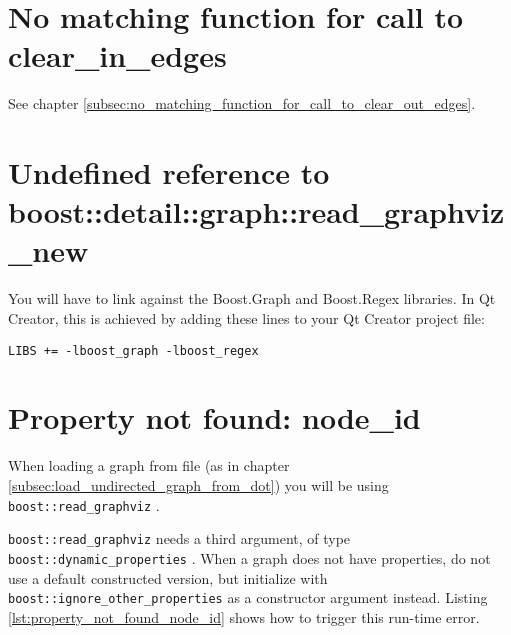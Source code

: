 \section{No matching function for call to clear\_in\_edges}
\label{subsec:no_matching_function_for_call_to_clear_in_edges}

See chapter \ref{subsec:no_matching_function_for_call_to_clear_out_edges}.

\section{Undefined reference to boost::detail::graph::read\_graphviz\_new}
\label{subsec:undefined_reference_to_read_graphviz_new}

You will have to link 
against the Boost.Graph and Boost.Regex libraries.
In Qt Creator, this is achieved by adding these lines to your Qt Creator
project file:

\begin{verbatim}
LIBS += -lboost_graph -lboost_regex 
\end{verbatim}

\section{Property not found: node\_id}
\label{subsec:property_not_found_node_id}

When loading a graph from file 
(as in chapter \ref{subsec:load_undirected_graph_from_dot})
you will be using 
\verb;boost::read_graphviz; .

\verb;boost::read_graphviz; 
needs a third argument, of type 
\verb;boost::dynamic_properties; .
When a graph does not have properties, do not use a default constructed
version, but initialize with 
\verb;boost::ignore_other_properties; 
as a constructor argument instead. 
Listing \ref{lst:property_not_found_node_id} 
shows how to trigger this run-time error.

